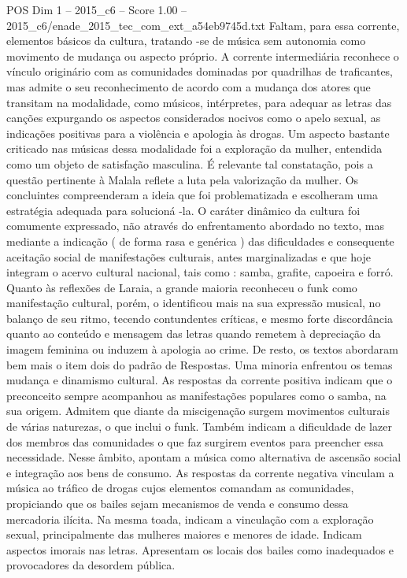 \begin{textsample}{POS Dim 1 – 2015\_c6 – Score 1.00 – 2015\_c6/enade\_2015\_tec\_com\_ext\_a54eb9745d.txt}
Faltam, para essa corrente, elementos básicos da cultura, tratando -se de música sem autonomia como movimento de mudança ou aspecto próprio.
A corrente intermediária reconhece o vínculo originário com as comunidades dominadas por quadrilhas de traficantes, mas admite o seu reconhecimento de acordo com a mudança dos atores que transitam na modalidade, como músicos, intérpretes, para adequar as letras das canções expurgando os aspectos considerados nocivos como o apelo sexual, as indicações positivas para a violência e apologia às drogas.
Um aspecto bastante criticado nas músicas dessa modalidade foi a exploração da mulher, entendida como um objeto de satisfação masculina.
É relevante tal constatação, pois a questão pertinente à Malala reflete a luta pela valorização da mulher.
Os concluintes compreenderam a ideia que foi problematizada e escolheram uma estratégia adequada para solucioná -la.
O caráter dinâmico da cultura foi comumente expressado, não através do enfrentamento abordado no texto, mas mediante a indicação ( de forma rasa e genérica ) das dificuldades e consequente aceitação social de manifestações culturais, antes marginalizadas e que hoje integram o acervo cultural nacional, tais como : samba, grafite, capoeira e forró.
Quanto às reflexões de Laraia, a grande maioria reconheceu o funk como manifestação cultural, porém, o identificou mais na sua expressão musical, no balanço de seu ritmo, tecendo contundentes críticas, e mesmo forte discordância quanto ao conteúdo e mensagem das letras quando remetem à depreciação da imagem feminina ou induzem à apologia ao crime.
De resto, os textos abordaram bem mais o item dois do padrão de Respostas.
Uma minoria enfrentou os temas mudança e dinamismo cultural.
As respostas da corrente positiva indicam que o preconceito sempre acompanhou as manifestações populares como o samba, na sua origem.
Admitem que diante da miscigenação surgem movimentos culturais de várias naturezas, o que inclui o funk.
Também indicam a dificuldade de lazer dos membros das comunidades o que faz surgirem eventos para preencher essa necessidade.
Nesse âmbito, apontam a música como alternativa de ascensão social e integração aos bens de consumo.
As respostas da corrente negativa vinculam a música ao tráfico de drogas cujos elementos comandam as comunidades, propiciando que os bailes sejam mecanismos de venda e consumo dessa mercadoria ilícita.
Na mesma toada, indicam a vinculação com a exploração sexual, principalmente das mulheres maiores e menores de idade.
Indicam aspectos imorais nas letras.
Apresentam os locais dos bailes como inadequados e provocadores da desordem pública.

\end{textsample}
